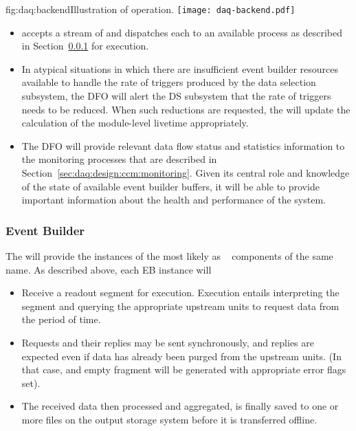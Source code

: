 \begin{dunefigure}{fig:daq:backend}{Illustration of   operation.}
  \texttt{[image: daq-backend.pdf]}
\end{dunefigure}

\begin{itemize}
\item {} accepts a stream of  and dispatches each to an available  process as described in Section~\ref{sec:fd-daq:design-event-builder} for execution.
\item In atypical situations in which there are insufficient event builder resources available to handle the rate of triggers produced by the data selection subsystem, the DFO will alert the DS subsystem that the rate of triggers needs to be reduced.  When such reductions are requested, the  will update the calculation of the module-level  livetime appropriately.
\item The DFO will provide relevant data flow status and statistics information to the monitoring processes that are described in Section~\ref{sec:daq:design:ccm:monitoring}. Given its central role and knowledge of the state of available event builder buffers, it will be able to provide important information about the health and performance of the system.
\end{itemize}

\subsubsection{Event Builder}
\label{sec:fd-daq:design-event-builder}

The  will provide the instances of the  most likely as
~\cite{artdaq} components of the same name. 
As described above, each EB instance will

\begin{itemize}
  \item Receive a readout segment for execution. Execution entails interpreting the  segment and querying the appropriate upstream  units to request data from the period of time. 
  \item Requests and their replies may be sent synchronously, and replies are expected even if data has already been purged from the upstream  units. (In that case, and empty fragment will be generated with appropriate error flags set).
  \item The received data then processed and aggregated, is finally saved to one or more files on the output storage system before it is transferred offline.
\end{itemize}

